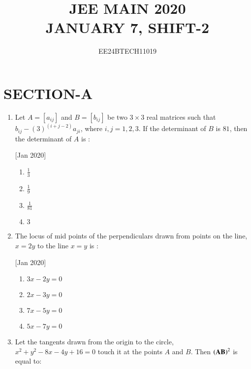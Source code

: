 \documentclass[journal,12pt,twocolumn]{IEEEtran}
\theoremstyle{remark}
\begin{document}

\vspace{3cm}

\title{\textbf{JEE MAIN 2020\\JANUARY 7, SHIFT-2}}
\author{EE24BTECH11019}
\maketitle
\newpage
\bigskip

\renewcommand{\thefigure}{\theenumi}
\renewcommand{\thetable}{\theenumi}

\section*{\textbf{SECTION-A}}
\bigskip

\begin{enumerate}

    \item Let $A=[a_{ij}]$ and $B=[b_{ij}]$ be two $3\times3$ real matrices such that $b_{ij}-(3)^{(i+j-2)}a_{ji}$, where $i,j=1,2,3$. If the determinant of $B$ is $81$, then the determinant of $A$ is :
    
    \hfill[Jan 2020]
        \begin{enumerate}
            \item $\frac{1}{3}$
            \item $\frac{1}{9}$
            \item $\frac{1}{81}$
            \item $3$
        \end{enumerate}

    \item The locus of mid points of the perpendiculars drawn from points on the line, $x=2y$ to the line $x=y$ is :
    
    \hfill[Jan 2020]
        \begin{enumerate}
            \item $3x-2y=0$
            \item $2x-3y=0$
            \item $7x-5y=0$
            \item $5x-7y=0$
        \end{enumerate}

    \item Let the tangents drawn from the origin to the circle, $x^2+y^2-8x-4y+16=0$ touch it at the points $A$ and $B$. Then $\left(\mathbf{AB}\right)^2$ is equal to:
    

\end{enumerate}
\end{document}
